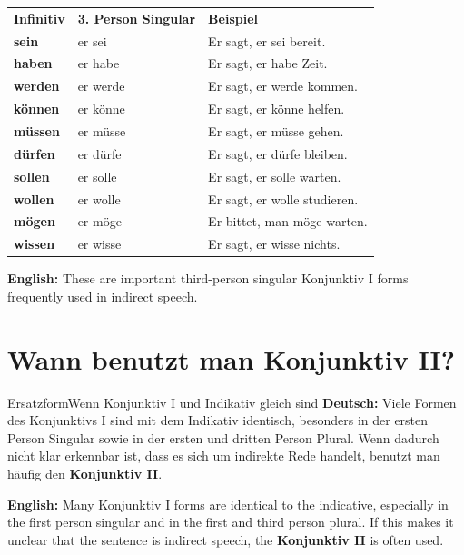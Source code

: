 \documentclass[a4paper,11pt]{article}
\newcommand{\GermanText}[1]{\textbf{Deutsch: }#1\par}
\newcommand{\EnglishText}[1]{{\small\color{SoftGray}\textbf{English: }#1\par}}
\begin{document}
        \begin{longtable}{>{\bfseries}p{3.4cm}|p{4.2cm}|p{6.4cm}}
            \rowcolor{HeaderBlueDark}
            \color{white}\textbf{Infinitiv} &
            \color{white}\textbf{3. Person Singular} &
            \color{white}\textbf{Beispiel} \\
            sein & er sei & Er sagt, er sei bereit. \\
            haben & er habe & Er sagt, er habe Zeit. \\
            werden & er werde & Er sagt, er werde kommen. \\
            können & er könne & Er sagt, er könne helfen. \\
            müssen & er müsse & Er sagt, er müsse gehen. \\
            dürfen & er dürfe & Er sagt, er dürfe bleiben. \\
            sollen & er solle & Er sagt, er solle warten. \\
            wollen & er wolle & Er sagt, er wolle studieren. \\
            mögen & er möge & Er bittet, man möge warten. \\
            wissen & er wisse & Er sagt, er wisse nichts. \\
        \end{longtable}

        \EnglishText{These are important third-person singular Konjunktiv I forms frequently used in indirect speech.}


    \section{Wann benutzt man Konjunktiv II?}

        \begin{grammarentry}{Ersatzform}{Wenn Konjunktiv I und Indikativ gleich sind}
            \GermanText{Viele Formen des Konjunktivs I sind mit dem Indikativ identisch, besonders in der ersten Person Singular sowie in der ersten und dritten Person Plural. Wenn dadurch nicht klar erkennbar ist, dass es sich um indirekte Rede handelt, benutzt man häufig den \textbf{Konjunktiv II}.}
            \EnglishText{Many Konjunktiv I forms are identical to the indicative, especially in the first person singular and in the first and third person plural. If this makes it unclear that the sentence is indirect speech, the \textbf{Konjunktiv II} is often used.}
        \end{grammarentry}
\end{document}
